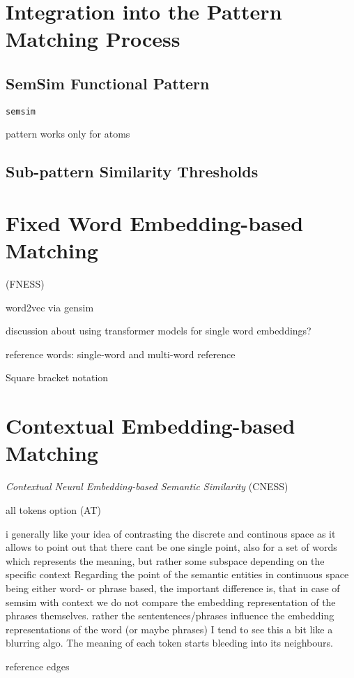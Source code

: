\documentclass[11pt]{scrreprt}
\begin{document}
\section{Integration into the Pattern Matching Process}
\subsection{SemSim Functional Pattern}
\texttt{semsim} 

pattern works only for atoms

\subsection{Sub-pattern Similarity Thresholds}


\section{Fixed Word Embedding-based Matching}
(FNESS)
 
word2vec via gensim

discussion about using transformer models for single word embeddings?


reference words: single-word and multi-word reference

\label{sec:semsim-multi-word}
Square bracket notation 

\section{Contextual Embedding-based Matching}
\textit{Contextual Neural Embedding-based Semantic Similarity} 
(CNESS)

all tokens option (AT)


i generally like your idea of contrasting the discrete and continous space as it allows to point out that there cant be one single point, also for a set of words which represents the meaning, but rather some subspace depending on the specific context
Regarding the point of the semantic entities in continuous space being either word- or phrase based, the important difference is, that in case of semsim with context we do not compare the embedding representation of the phrases themselves. rather the sententences/phrases influence the embedding representations of the word (or maybe phrases)
 I tend to see this a bit like a blurring algo. The meaning of each token starts bleeding into its neighbours.


reference edges
\end{document}
